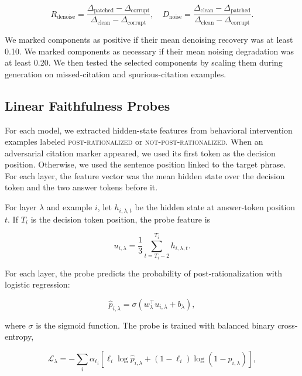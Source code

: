 \documentclass[11pt]{article}
\begin{document}
\begin{equation}
    R_{\mathrm{denoise}} = \frac{\Delta_{\mathrm{patched}} - \Delta_{\mathrm{corrupt}}}{\Delta_{\mathrm{clean}} - \Delta_{\mathrm{corrupt}}},
    \quad
    D_{\mathrm{noise}} = \frac{\Delta_{\mathrm{clean}} - \Delta_{\mathrm{patched}}}{\Delta_{\mathrm{clean}} - \Delta_{\mathrm{corrupt}}}.
\end{equation}

We marked components as positive if their mean denoising recovery was at least 0.10. We marked components as necessary if their mean noising degradation was at least 0.20. We then tested the selected components by scaling them during generation on missed-citation and spurious-citation examples.

\subsection{Linear Faithfulness Probes}

For each model, we extracted hidden-state features from behavioral intervention examples labeled \textsc{post-rationalized} or \textsc{not-post-rationalized}. When an adversarial citation marker appeared, we used its first token as the decision position. Otherwise, we used the sentence position linked to the target phrase. For each layer, the feature vector was the mean hidden state over the decision token and the two answer tokens before it.

For layer $\lambda$ and example $i$, let $h_{i,\lambda,t}$ be the hidden state at answer-token position $t$. If $T_i$ is the decision token position, the probe feature is

\begin{equation}
    u_{i,\lambda}=\frac{1}{3}\sum_{t=T_i-2}^{T_i} h_{i,\lambda,t}.
\end{equation}

For each layer, the probe predicts the probability of post-rationalization with logistic regression:

\begin{equation}
    \hat{p}_{i,\lambda}=\sigma(w_{\lambda}^{\top}u_{i,\lambda}+b_{\lambda}),
\end{equation}

where $\sigma$ is the sigmoid function. The probe is trained with balanced binary cross-entropy,

\begin{equation}
    \mathcal{L}_{\lambda}= -\sum_i \alpha_{\ell_i}\left[\ell_i \log \hat{p}_{i,\lambda} + (1-\ell_i)\log(1-\hat{p}_{i,\lambda})\right],
\end{equation}
\end{document}
